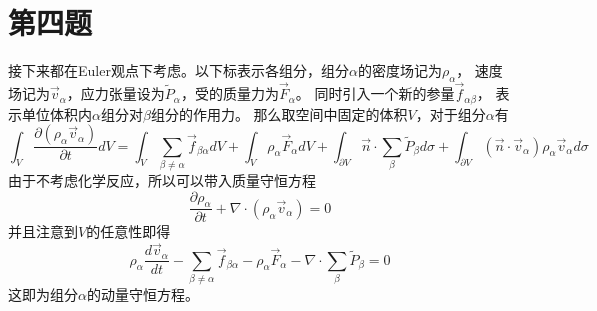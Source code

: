 \documentclass[UTF8]{ctexart}
\begin{document}
\section{第四题}

接下来都在Euler观点下考虑。以下标表示各组分，组分$\alpha$的密度场记为$\rho_\alpha$，
速度场记为$\vec v_\alpha$，应力张量设为$\tilde P_\alpha$，受的质量力为$\vec F_\alpha$。
同时引入一个新的参量$\vec f_{\alpha\beta}$，
表示单位体积内$\alpha$组分对$\beta$组分的作用力。
那么取空间中固定的体积$V$，对于组分$\alpha$有
\begin{equation}
    \int_V \frac{\partial (\rho_\alpha\vec v_\alpha)}{\partial t} dV
    =\int_V \sum_{\beta\neq\alpha} \vec f_{\beta\alpha} dV
    +\int_V \rho_\alpha \vec F_\alpha dV
    +\int_{\partial V} \vec n \cdot \sum_{\beta}\tilde P_\beta  d\sigma
    +\int_{\partial V} (\vec n \cdot \vec v_\alpha) \rho_\alpha \vec v_\alpha d\sigma
    \tag{1}
\end{equation}
\noindent 由于不考虑化学反应，所以可以带入质量守恒方程
\begin{equation}
    \frac{\partial \rho_\alpha}{\partial t}+\nabla\cdot(\rho_\alpha\vec v_\alpha)=0
\end{equation}
\noindent 并且注意到$V$的任意性即得
\begin{equation}
    \rho_\alpha \frac{d \vec v_\alpha}{d t}
    -\sum_{\beta\neq\alpha} \vec f_{\beta\alpha}
    -\rho_\alpha \vec F_\alpha
    -\nabla\cdot\sum_\beta \tilde P_\beta
    =0
\end{equation}
\noindent 这即为组分$\alpha$的动量守恒方程。
\end{document}
